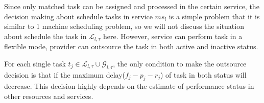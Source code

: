 Since only matched task can be assigned and processed in the certain service, the decision making about schedule tasks in service $ms_l$ is a simple problem that it is similar to 1 machine scheduling problem, so we will not discuss the situation about schedule the task in $\mathcal{L}_{l,\tau}$ here. However, service can perform task in a flexible mode, provider can outsource the task in both active and inactive status.

For each single task $t_j\in\mathcal{L}_{l,\tau}\cup\mathcal{G}_{l,\tau}$, the only condition to make the outsource decision is that if the maximum delay($f_j-p_j-r_j$) of task in both status will decrease. This decision highly depends on the estimate of performance status in other resources and services.


